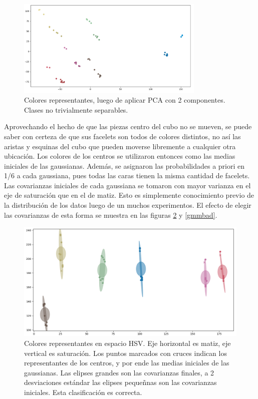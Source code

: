 \begin{figure}[h!]
	\centering
	\includegraphics[width=0.8\textwidth]{figures/rgb_pca}
	\caption[Colores representantes, luego de aplicar PCA con 2 componentes]{Colores representantes, luego de aplicar PCA con 2 componentes. Clases no trivialmente separables.}
	\label{rgb3d}
\end{figure}

Aprovechando el hecho de que las piezas centro del cubo no se mueven, se puede saber con certeza de que sus facelets son todos de colores distintos, no así las aristas y esquinas del cubo que pueden moverse libremente a cualquier otra ubicación. Los colores de los centros se utilizaron entonces como las medias iniciales de las gaussianas. Además, se asignaron las probabilidades a priori en 1/6 a cada gaussiana, pues todas las caras tienen la misma cantidad de facelets. Las covarianzas iniciales de cada gaussiana se tomaron con mayor varianza en el eje de saturación que en el de matiz. Esto es simplemente conocimiento previo de la distribución de los datos luego de un muchos experimentos. El efecto de elegir las covarianzas de esta forma se muestra en las figuras \ref{gmmgood} y \ref{gmmbad}.

\begin{figure}[h!]
	\centering
	\includegraphics[width=\textwidth]{figures/gmm}
	\caption[Colores representantes en espacio HSV.]{Colores representantes en espacio HSV. Eje horizontal es matiz, eje vertical es saturación. Los puntos marcados con cruces indican los representantes de los centros, y por ende las medias iniciales de las gaussianas. Las elipses grandes son las covarianzas finales, a 2 desviaciones estándar las elipses pequeñnas son las covarianzas iniciales. Esta clasificación es correcta.}
	\label{gmmgood}
\end{figure}

